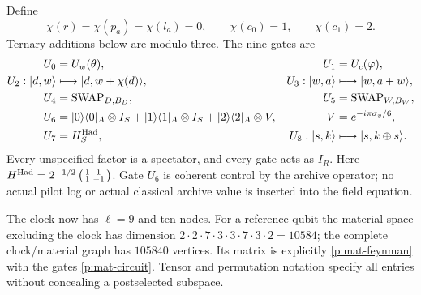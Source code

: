 \documentclass[11pt,oneside,openany]{book}
\theoremstyle{definition}
\theoremstyle{remark}\newtheorem{remark}[theorem]{Remark}
\begin{document}
Define
\begin{equation}\label{p:mat-status}
 \chi(r)=\chi(p_a)=\chi(l_a)=0,\qquad
 \chi(c_0)=1,\qquad\chi(c_1)=2.
\end{equation}
Ternary additions below are modulo three.  The nine gates are
\begin{align}\label{p:mat-circuit}
 U_0&=U_w(\theta),& U_1&=U_c(\varphi),\nonumber\\
 U_2: |d,w\rangle&\longmapsto|d,w+\chi(d)\rangle,
 &U_3: |w,a\rangle&\longmapsto|w,a+w\rangle,\nonumber\\
 U_4&=\operatorname{SWAP}_{D,B_D},
 &U_5&=\operatorname{SWAP}_{W,B_W},\\
 U_6&=|0\rangle\langle0|_A\otimes I_S
       +|1\rangle\langle1|_A\otimes I_S
       +|2\rangle\langle2|_A\otimes V,
 &V&=e^{-i\pi\sigma_y/6},\nonumber\\
 U_7&=H_S^{\rm Had},
 &U_8: |s,k\rangle&\longmapsto|s,k\mathbin{\oplus}s\rangle.
 \nonumber
\end{align}
Every unspecified factor is a spectator, and every gate acts as
$I_R$.  Here
$H^{\rm Had}=2^{-1/2}\left(\begin{smallmatrix}1&1\\1&-1\end{smallmatrix}\right)$.
Gate $U_6$ is coherent control by the archive operator; no actual
pilot log or actual classical archive value is inserted into the
field equation.

The clock now has $\ell=9$ and ten nodes.  For a reference qubit the
material space excluding the clock has dimension
$2\cdot2\cdot7\cdot3\cdot3\cdot7\cdot3\cdot2=10584$; the complete
clock/material graph has $105840$ vertices.  Its matrix is explicitly
\eqref{p:mat-feynman} with the gates \eqref{p:mat-circuit}.  Tensor and
permutation notation specify all entries without concealing a
postselected subspace.
\end{document}
